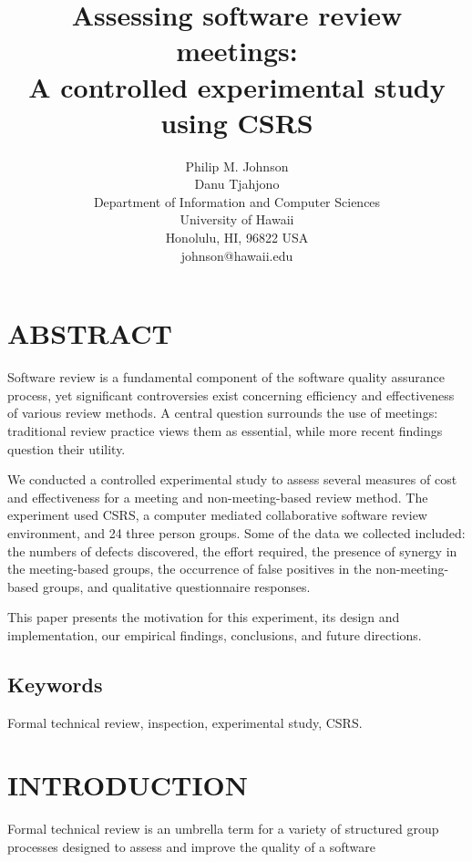 


\title{Assessing software review meetings: \\ A controlled experimental study using CSRS}

\author{
        Philip M. Johnson\\
        Danu Tjahjono\\
        Department of Information and Computer Sciences\\
        University of Hawaii\\
        Honolulu, HI, 96822 USA\\
        johnson@hawaii.edu
       }


\maketitle

\section{ABSTRACT}

Software review is a fundamental component of the software quality
assurance process, yet significant controversies exist concerning
efficiency and effectiveness of various review methods. A central question
surrounds the use of meetings: traditional review practice views them as
essential, while more recent findings question their utility.

We conducted a controlled experimental study to assess several measures of
cost and effectiveness for a meeting and non-meeting-based review method.
The experiment used CSRS, a computer mediated collaborative software review
environment, and 24 three person groups.  Some of the data we collected
included: the numbers of defects discovered, the effort required, the
presence of synergy in the meeting-based groups, the occurrence of false
positives in the non-meeting-based groups, and qualitative questionnaire
responses.

This paper presents the motivation for this experiment, its design and
implementation, our empirical findings, conclusions, and future directions.


\subsection{Keywords}
Formal technical review, inspection, experimental study, CSRS.

\section{INTRODUCTION}

Formal technical review is an umbrella term for a variety of structured
group processes designed to assess and improve the quality of a software



